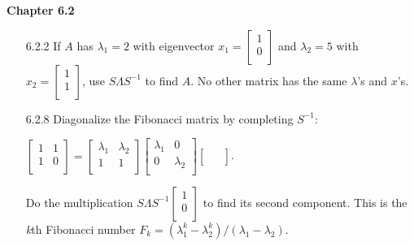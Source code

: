 \documentclass[10pt,twoside,reqno]{article}
\begin{document}
\vspace{5mm}
\textbf{Chapter 6.2}
\begin{enumerate}
\item[6.2.2] If $A$ has $\lambda_1 = 2$ with eigenvector $x_1=
\begin{bmatrix}
1\\
0\\
\end{bmatrix}$ and $\lambda_2=5$ with $x_2=
\begin{bmatrix}
1\\
1\\
\end{bmatrix}$, use $S \Lambda S^{-1}$ to find $A$. No other matrix has the same $\lambda$'s and $x$'s. \\ \vspace{2mm}


\vspace{3mm}
\item[6.2.8] Diagonalize the Fibonacci matrix by completing $S^{-1}$: \\
\begin{center}
$
\begin{bmatrix}
1&1\\
1&0\\
\end{bmatrix}
=
\begin{bmatrix}
\lambda_1&\lambda_2\\
1&1\\
\end{bmatrix}
\begin{bmatrix}
\lambda_1&0\\
0&\lambda_2\\
\end{bmatrix}
\begin{bmatrix}
&\\
&\\
\end{bmatrix}
$. \\
\end{center}
Do the multiplication $S \Lambda S^{-1}
\begin{bmatrix}
1\\
0\\
\end{bmatrix}$ to find its second component. This is the \textit{k}th Fibonacci number $F_k=(\lambda_1^k-\lambda_2^k)/(\lambda_1-\lambda_2)$.
\vspace{2mm}



\end{enumerate}
\end{document}

